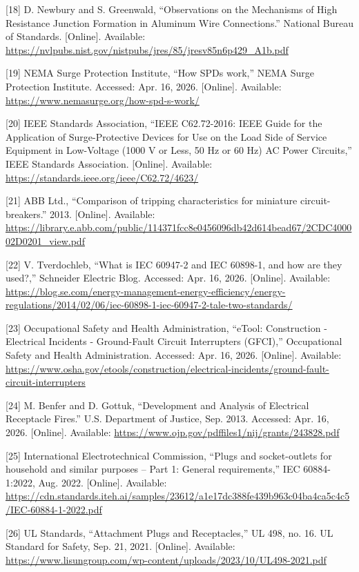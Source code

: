 \begin{thesisreferences}
{[}18{]} D. Newbury and S. Greenwald, ``Observations on the Mechanisms
of High Resistance Junction Formation in Aluminum Wire Connections.''
National Bureau of Standards. {[}Online{]}. Available:
\url{https://nvlpubs.nist.gov/nistpubs/jres/85/jresv85n6p429_A1b.pdf}

{[}19{]} NEMA Surge Protection Institute, ``How SPDs work,'' NEMA Surge
Protection Institute. Accessed: Apr. 16, 2026. {[}Online{]}. Available:
\url{https://www.nemasurge.org/how-spd-s-work/}

{[}20{]} IEEE Standards Association, ``IEEE C62.72-2016: IEEE Guide for
the Application of Surge-Protective Devices for Use on the Load Side of
Service Equipment in Low-Voltage (1000 V or Less, 50 Hz or 60 Hz) AC
Power Circuits,'' IEEE Standards Association. {[}Online{]}. Available:
\url{https://standards.ieee.org/ieee/C62.72/4623/}

{[}21{]} ABB Ltd., ``Comparison of tripping characteristics for
miniature circuit-breakers.'' 2013. {[}Online{]}. Available:
\url{https://library.e.abb.com/public/114371fcc8e0456096db42d614bead67/2CDC400002D0201_view.pdf}

{[}22{]} V. Tverdochleb, ``What is IEC 60947-2 and IEC 60898-1, and how
are they used?,'' Schneider Electric Blog. Accessed: Apr. 16, 2026.
{[}Online{]}. Available:
\url{https://blog.se.com/energy-management-energy-efficiency/energy-regulations/2014/02/06/iec-60898-1-iec-60947-2-tale-two-standards/}

{[}23{]} Occupational Safety and Health Administration, ``eTool:
Construction - Electrical Incidents - Ground-Fault Circuit Interrupters
(GFCI),'' Occupational Safety and Health Administration. Accessed:
Apr. 16, 2026. {[}Online{]}. Available:
\url{https://www.osha.gov/etools/construction/electrical-incidents/ground-fault-circuit-interrupters}

{[}24{]} M. Benfer and D. Gottuk, ``Development and Analysis of
Electrical Receptacle Fires.'' U.S. Department of Justice, Sep. 2013.
Accessed: Apr. 16, 2026. {[}Online{]}. Available:
\url{https://www.ojp.gov/pdffiles1/nij/grants/243828.pdf}

{[}25{]} International Electrotechnical Commission, ``Plugs and
socket-outlets for household and similar purposes -- Part 1: General
requirements,'' IEC 60884-1:2022, Aug. 2022. {[}Online{]}. Available:
\url{https://cdn.standards.iteh.ai/samples/23612/a1e17dc388fe439b963c04ba4ca5c4c5/IEC-60884-1-2022.pdf}

{[}26{]} UL Standards, ``Attachment Plugs and Receptacles,'' UL 498, no.
16. UL Standard for Safety, Sep. 21, 2021. {[}Online{]}. Available:
\url{https://www.lisungroup.com/wp-content/uploads/2023/10/UL498-2021.pdf}


\end{thesisreferences}
